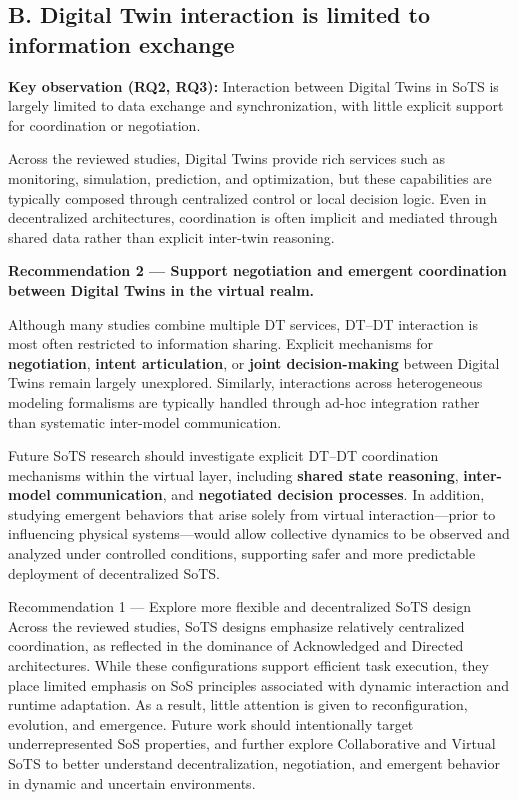 \subsection*{B. Digital Twin interaction is limited to information exchange}

\textbf{Key observation (RQ2, RQ3):}
Interaction between Digital Twins in SoTS is largely limited to data exchange and synchronization, with little explicit support for coordination or negotiation.

Across the reviewed studies, Digital Twins provide rich services such as monitoring, simulation, prediction, and optimization, but these capabilities are typically composed through centralized control or local decision logic. Even in decentralized architectures, coordination is often implicit and mediated through shared data rather than explicit inter-twin reasoning.

\begin{recobox}
\textbf{Recommendation 2 — Support negotiation and emergent coordination between Digital Twins in the virtual realm.}

Although many studies combine multiple DT services, DT--DT interaction is most often restricted to information sharing. Explicit mechanisms for \textbf{negotiation}, \textbf{intent articulation}, or \textbf{joint decision-making} between Digital Twins remain largely unexplored. Similarly, interactions across heterogeneous modeling formalisms are typically handled through ad-hoc integration rather than systematic inter-model communication.

Future SoTS research should investigate explicit DT--DT coordination mechanisms within the virtual layer, including \textbf{shared state reasoning}, \textbf{inter-model communication}, and \textbf{negotiated decision processes}. In addition, studying emergent behaviors that arise solely from virtual interaction---prior to influencing physical systems---would allow collective dynamics to be observed and analyzed under controlled conditions, supporting safer and more predictable deployment of decentralized SoTS.
\end{recobox}




Recommendation 1 — Explore more flexible and decentralized SoTS design
Across the reviewed studies, SoTS designs emphasize relatively centralized coordination, as reflected in the dominance of Acknowledged and Directed architectures. While these configurations support efficient task execution, they place limited emphasis on SoS principles associated with dynamic interaction and runtime adaptation. As a result, little attention is given to reconfiguration, evolution, and emergence. Future work should intentionally target underrepresented SoS properties, and further explore Collaborative and Virtual SoTS to better understand decentralization, negotiation, and emergent behavior in dynamic and uncertain environments.


